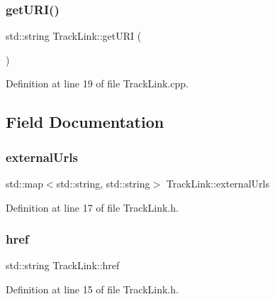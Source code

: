 \subsubsection{\texorpdfstring{get\+U\+R\+I()}{getURI()}}
{\footnotesize\ttfamily std\+::string Track\+Link\+::get\+U\+RI (\begin{DoxyParamCaption}{ }\end{DoxyParamCaption})}



Definition at line 19 of file Track\+Link.\+cpp.



\subsection{Field Documentation}
\mbox{\label{class_track_link_ab7723b5d1970c0942f27f42f075763fc}} 
\subsubsection{\texorpdfstring{external\+Urls}{externalUrls}}
{\footnotesize\ttfamily std\+::map$<$std\+::string, std\+::string$>$ Track\+Link\+::external\+Urls\hspace{0.3cm}{\ttfamily [private]}}



Definition at line 17 of file Track\+Link.\+h.

\mbox{\label{class_track_link_af1f738ca4c5cd1a8c612a98f9f7527d5}} 
\subsubsection{\texorpdfstring{href}{href}}
{\footnotesize\ttfamily std\+::string Track\+Link\+::href\hspace{0.3cm}{\ttfamily [private]}}



Definition at line 15 of file Track\+Link.\+h.

\mbox{\label{class_track_link_a0b93d8e0161b088a905a6efc031be395}} 
